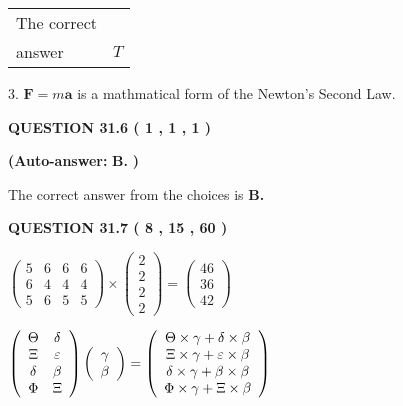 \documentclass[12pt]{article}
\begin{document}
\noindent\begin{tabular}{|l|l|}\hline The correct & \\
          answer &  %
$T$ \\ \hline \end{tabular}
3.  %
$\mathbf{F}=m\mathbf{a}$ is a mathmatical form of  %
the Newton's Second Law.
 
  
  
{\textbf{\large{QUESTION
31.6 
 (           1 ,           1 ,           1 )
}}}
 
 
{\textbf{(Auto-answer:}}
{\textbf{\large{
B.}}}
{\textbf{)}}
 
 

The correct answer from the choices is
{\textbf{\large{
B.}}}
 
  
  
{\textbf{\large{QUESTION
31.7 
 (           8 ,          15 ,          60 )
}}}

 
$\left( \begin{array}{ccccccccccccccc}
           5  & 
           6  & 
           6  & 
           6  \\ 
           6  & 
           4  & 
           4  & 
           4  \\ 
           5  & 
           6  & 
           5  & 
           5
\end{array}\right) \times
\left( \begin{array}{c}
           2  \\ 
           2  \\ 
           2  \\ 
           2
\end{array}\right)  =
\left( \begin{array}{c}
          46  \\ 
          36  \\ 
          42
\end{array}\right)  $
 
$  %
 \left( \begin{array}
 {
 c
 c
 }
 \Theta & 
 \delta \\ 
                    \Xi & 
 \varepsilon \\ 
 \delta & 
 \beta \\ 
 \Phi & 
                    \Xi
 \end{array} \right)
 \left( \begin{array}
 {
 c
 }
 \gamma \\ 
 \beta
 \end{array} \right)
=
 \left( \begin{array}
 {
 c
 }
  \Theta \times  \gamma +  \delta \times  \beta \\ 
                     \Xi \times  \gamma +  \varepsilon \times  \beta \\ 
  \delta \times  \gamma +  \beta \times  \beta \\ 
  \Phi \times  \gamma +                     \Xi \times  \beta
 \end{array} \right)
$
 
\end{document}

